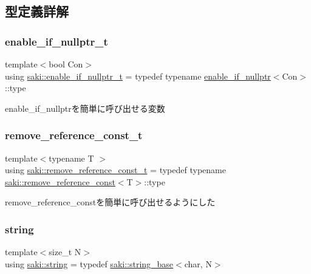 \subsection{型定義詳解}
\mbox{\label{namespacesaki_a4c362f5119aac94085eab0bf794facf7}} 
\subsubsection{\texorpdfstring{enable\+\_\+if\+\_\+nullptr\+\_\+t}{enable\_if\_nullptr\_t}}
{\footnotesize\ttfamily template$<$bool Con$>$ \\
using \mbox{\hyperlink{namespacesaki_a4c362f5119aac94085eab0bf794facf7}{saki\+::enable\+\_\+if\+\_\+nullptr\+\_\+t}} = typedef typename \mbox{\hyperlink{structsaki_1_1enable__if__nullptr}{enable\+\_\+if\+\_\+nullptr}}$<$Con$>$\+::type}



enable\+\_\+if\+\_\+nullptrを簡単に呼び出せる変数 

\mbox{\label{namespacesaki_aff6964622fdfcdf489dab4b87727a8e4}} 
\subsubsection{\texorpdfstring{remove\+\_\+reference\+\_\+const\+\_\+t}{remove\_reference\_const\_t}}
{\footnotesize\ttfamily template$<$typename T $>$ \\
using \mbox{\hyperlink{namespacesaki_aff6964622fdfcdf489dab4b87727a8e4}{saki\+::remove\+\_\+reference\+\_\+const\+\_\+t}} = typedef typename \mbox{\hyperlink{structsaki_1_1remove__reference__const}{saki\+::remove\+\_\+reference\+\_\+const}}$<$T$>$\+::type}



remove\+\_\+reference\+\_\+constを簡単に呼び出せるようにした 

\mbox{\label{namespacesaki_a47847d63f1d9c97ca37f33eeecb27674}} 
\subsubsection{\texorpdfstring{string}{string}}
{\footnotesize\ttfamily template$<$size\+\_\+t N$>$ \\
using \mbox{\hyperlink{namespacesaki_a47847d63f1d9c97ca37f33eeecb27674}{saki\+::string}} = typedef \mbox{\hyperlink{classsaki_1_1string__base}{saki\+::string\+\_\+base}}$<$char, N$>$}



